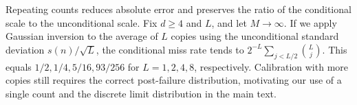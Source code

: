 Repeating counts reduces absolute error and preserves the ratio of the conditional scale to the unconditional scale. Fix $d\ge4$ and $L$, and let $M\to\infty$. If we apply Gaussian inversion to the average of $L$ copies using the unconditional standard deviation $s(n)/\sqrt L$, the conditional miss rate tends to $2^{-L}\sum_{j<L/2}\binom Lj$. This equals $1/2,1/4,5/16,93/256$ for $L=1,2,4,8$, respectively. Calibration with more copies still requires the correct post-failure distribution, motivating our use of a single count and the discrete limit distribution in the main text.
